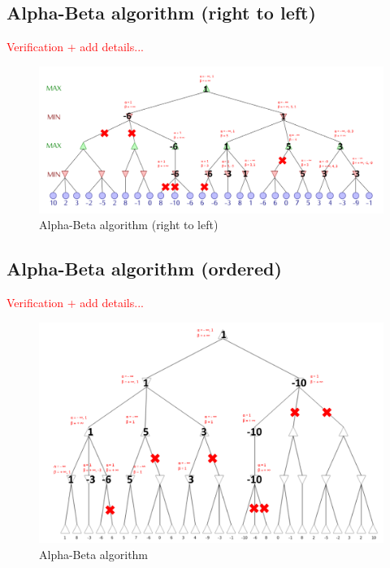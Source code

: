 \documentclass[en]{article}
\begin{document}
\subsection{Alpha-Beta algorithm (right to left)}

\textcolor{red}{Verification + add details...}

\begin{figure}[H]
 \centering
 \includegraphics[width=\textwidth]{Alphabeta_reverse.png}
 \caption{Alpha-Beta algorithm (right to left)}
 \label{fig:alphabeta_reverse}
\end{figure}


\subsection{Alpha-Beta algorithm (ordered)}

\textcolor{red}{Verification + add details...}

\begin{figure}[H]
 \centering
 \includegraphics[width=\textwidth]{Alphabeta_ordered.png}
 \caption{Alpha-Beta algorithm}
 \label{fig:alphabeta_ordered}
\end{figure}
\end{document}
